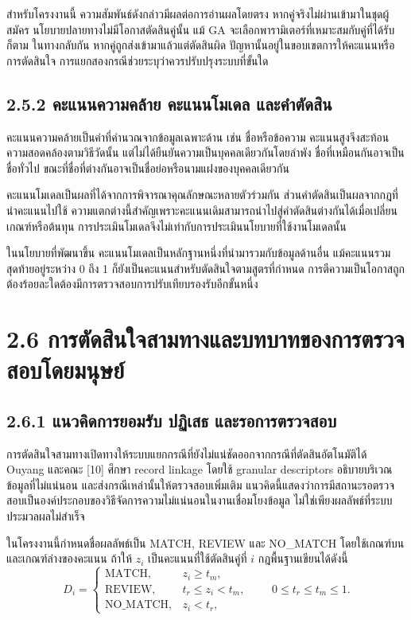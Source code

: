 \documentclass[12pt,a4paper]{report}
\begin{document}
สำหรับโครงงานนี้ ความสัมพันธ์ดังกล่าวมีผลต่อการอ่านผลโดยตรง หากคู่จริงไม่ผ่านเข้ามาในชุดผู้สมัคร นโยบายปลายทางไม่มีโอกาสตัดสินคู่นั้น แม้ GA จะเลือกพารามิเตอร์ที่เหมาะสมกับคู่ที่ได้รับก็ตาม ในทางกลับกัน หากคู่ถูกส่งเข้ามาแล้วแต่ตัดสินผิด ปัญหานั้นอยู่ในขอบเขตการให้คะแนนหรือการตัดสินใจ การแยกสองกรณีช่วยระบุว่าควรปรับปรุงระบบที่ขั้นใด

\subsection*{2.5.2 คะแนนความคล้าย คะแนนโมเดล และคำตัดสิน}
คะแนนความคล้ายเป็นค่าที่คำนวณจากข้อมูลเฉพาะด้าน เช่น ชื่อหรือข้อความ คะแนนสูงจึงสะท้อนความสอดคล้องตามวิธีวัดนั้น แต่ไม่ได้ยืนยันความเป็นบุคคลเดียวกันโดยลำพัง ชื่อที่เหมือนกันอาจเป็นชื่อทั่วไป ขณะที่ชื่อที่ต่างกันอาจเป็นชื่อย่อหรือนามแฝงของบุคคลเดียวกัน

คะแนนโมเดลเป็นผลที่ได้จากการพิจารณาคุณลักษณะหลายตัวร่วมกัน ส่วนคำตัดสินเป็นผลจากกฎที่นำคะแนนไปใช้ ความแตกต่างนี้สำคัญเพราะคะแนนเดิมสามารถนำไปสู่คำตัดสินต่างกันได้เมื่อเปลี่ยนเกณฑ์หรือต้นทุน การประเมินโมเดลจึงไม่เท่ากับการประเมินนโยบายที่ใช้งานโมเดลนั้น

ในนโยบายที่พัฒนาขึ้น คะแนนโมเดลเป็นหลักฐานหนึ่งที่นำมารวมกับข้อมูลด้านอื่น แม้คะแนนรวมสุดท้ายอยู่ระหว่าง 0 ถึง 1 ก็ยังเป็นคะแนนสำหรับตัดสินใจตามสูตรที่กำหนด การตีความเป็นโอกาสถูกต้องร้อยละใดต้องมีการตรวจสอบการปรับเทียบรองรับอีกขั้นหนึ่ง

\section*{2.6 การตัดสินใจสามทางและบทบาทของการตรวจสอบโดยมนุษย์}
\subsection*{2.6.1 แนวคิดการยอมรับ ปฏิเสธ และรอการตรวจสอบ}
การตัดสินใจสามทางเปิดทางให้ระบบแยกกรณีที่ยังไม่แน่ชัดออกจากกรณีที่ตัดสินอัตโนมัติได้ Ouyang และคณะ [10] ศึกษา record linkage โดยใช้ granular descriptors อธิบายบริเวณข้อมูลที่ไม่แน่นอน และส่งกรณีเหล่านั้นให้ตรวจสอบเพิ่มเติม แนวคิดนี้แสดงว่าการมีสถานะรอตรวจสอบเป็นองค์ประกอบของวิธีจัดการความไม่แน่นอนในงานเชื่อมโยงข้อมูล ไม่ใช่เพียงผลลัพธ์ที่ระบบประมวลผลไม่สำเร็จ

ในโครงงานนี้กำหนดชื่อผลลัพธ์เป็น MATCH, REVIEW และ NO\_MATCH โดยใช้เกณฑ์บนและเกณฑ์ล่างของคะแนน ถ้าให้ $z_i$ เป็นคะแนนที่ใช้ตัดสินคู่ที่ $i$ กฎพื้นฐานเขียนได้ดังนี้
\begin{equation*}
D_i=\begin{cases}
\mathrm{MATCH}, & z_i\geq t_m,\\
\mathrm{REVIEW}, & t_r\leq z_i<t_m,\\
\mathrm{NO\_MATCH}, & z_i<t_r,
\end{cases}\qquad 0\leq t_r\leq t_m\leq1.
\end{equation*}
\end{document}
